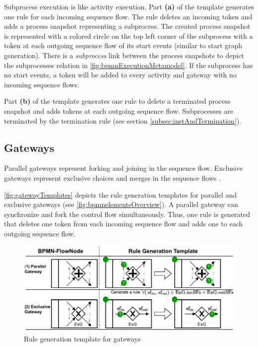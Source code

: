 \documentclass{lmcs} %
\begin{document}
Subprocess execution is like activity execution.
Part \textbf{(a)} of the template generates one rule for each incoming sequence flow.
The rule deletes an incoming token and adds a process snapshot representing a subprocess. 
The created process snapshot is represented with a colored circle on the top left corner of the subprocess with a token at each outgoing sequence flow of its start events (similar to start graph generation).
There is a \textit{subprocess} link between the process snapshots to depict the \textsf{subprocesses} relation in \autoref{fig:bpmnExecutionMetamodel}.
If the subprocess has no start events, a token will be added to every activity and gateway with no incoming sequence flows.

Part \textbf{(b)} of the template generates one rule to delete a terminated process snapshot and adds tokens at each outgoing sequence flow.
Subprocesses are terminated by the termination rule (see section \ref{subsec:instAndTermination}).

\subsection{Gateways}
Parallel gateways represent forking and joining in the sequence flow.
Exclusive gateways represent exclusive choices and merges in the sequence flows \cite{objectmanagementgroupBusinessProcessModel2013}.


\autoref{fig:gatewayTemplates} depicts the rule generation templates for parallel and exclusive gateways (see \autoref{fig:bpmnelementsOverview}).
A parallel gateway can synchronize and fork the control flow simultaneously.
Thus, one rule is generated that deletes one token from each incoming sequence flow and adds one to each outgoing sequence flow.

\begin{figure}[ht]
    \centering
    \includegraphics[width=1\textwidth]{images/gateways_template.pdf}
    \caption{Rule generation template for gateways}
    \label{fig:gatewayTemplates}
\end{figure}
\end{document}
